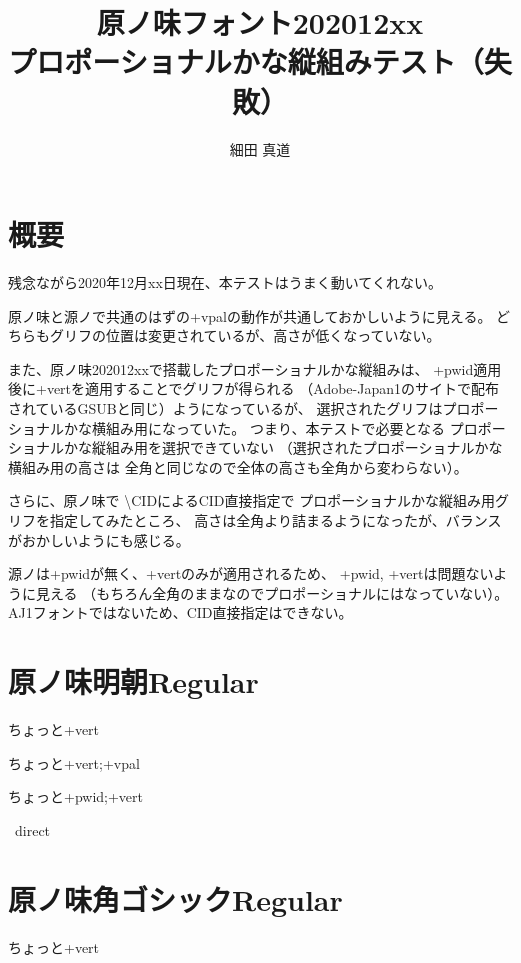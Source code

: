 \documentclass[tate,paper={297mm,210mm}]{jlreq}
\title{原ノ味フォント202012xx \\ プロポーショナルかな縦組みテスト（失敗）}
\author{細田 真道}
\begin{document}
\maketitle

\section*{概要}

残念ながら2020年12月xx日現在、本テストはうまく動いてくれない。

原ノ味と源ノで共通のはずの+vpalの動作が共通しておかしいように見える。
どちらもグリフの位置は変更されているが、高さが低くなっていない。

また、原ノ味202012xxで搭載したプロポーショナルかな縦組みは、
+pwid適用後に+vertを適用することでグリフが得られる
（Adobe-Japan1のサイトで配布されているGSUBと同じ）ようになっているが、
選択されたグリフはプロポーショナルかな横組み用になっていた。
つまり、本テストで必要となる
プロポーショナルかな縦組み用を選択できていない
（選択されたプロポーショナルかな横組み用の高さは
  全角と同じなので全体の高さも全角から変わらない）。

さらに、原ノ味で \textbackslash CIDによるCID直接指定で
プロポーショナルかな縦組み用グリフを指定してみたところ、
高さは全角より詰まるようになったが、バランスがおかしいようにも感じる。

源ノは+pwidが無く、+vertのみが適用されるため、
+pwid, +vertは問題ないように見える
（もちろん全角のままなのでプロポーショナルにはなっていない）。
AJ1フォントではないため、CID直接指定はできない。

\clearpage

\section*{原ノ味明朝Regular}

\hmrnone\hbox{\tate\vrule ちょっと\vrule +vert}

\hmrvpal\hbox{\tate\vrule ちょっと\vrule +vert;+vpal}

\hmrpwidvert\hbox{\tate\vrule ちょっと\vrule +pwid;+vert}

\hmrnone\hbox{\tate\vrule%
  \vrule direct}

\section*{原ノ味角ゴシックRegular}

\hgrnone\hbox{\tate\vrule ちょっと\vrule +vert}
\end{document}
